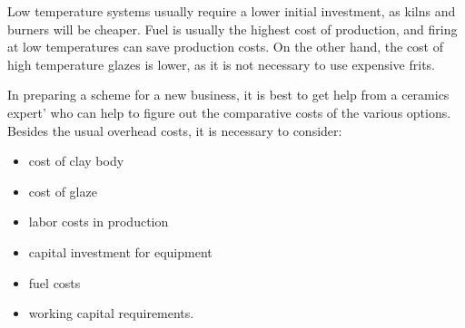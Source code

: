 Low temperature systems usually require a lower initial investment, as kilns 
and burners will be cheaper. Fuel is usually the highest cost of production, 
and firing at low temperatures can save production costs. On the other hand, 
the cost of high temperature glazes is lower, as it is not necessary to use 
expensive frits.

In preparing a scheme for a new business, it is best to get help from a 
ceramics expert' who can help to figure out the comparative costs of the 
various options. Besides the usual overhead costs, it is necessary to consider:
\begin{itemize}
\item cost of clay body
\item cost of glaze
\item labor costs in production
\item capital investment for equipment
\item fuel costs
\item working capital requirements.
\end{itemize}
